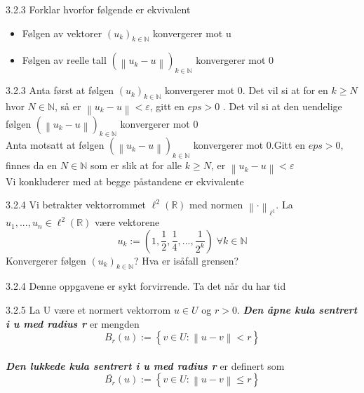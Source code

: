 \documentclass[a4paper,norsk]{article}
\renewcommand{\geq}{\geqslant}
\renewcommand{\leq}{\leqslant}
\newcommand{\eps} {\varepsilon}
\begin{document}
\begin{oppgavebox}{3.2.3}{}
Forklar hvorfor følgende er ekvivalent
\begin{itemize}
    \item Følgen av vektorer $ \left( u_k \right) _{k \in \mathbb{N}} $ konvergerer mot u
    \item Følgen av reelle tall $ \left( \left\lVert u_k - u \right\rVert  \right)_{k \in \mathbb{N}}  $ konvergerer mot 0
\end{itemize}

\begin{proofbox}{3.2.3}{}
Anta først at følgen $ \left( u_k \right) _{k \in \mathbb{N}} $ konvergerer mot 0. Det vil si at for en $ k\geq N $ hvor $ N \in \mathbb{N} $, så er $ \left\lVert u_k - u \right\rVert < \eps $, gitt en $ eps > 0 $ . Det vil si at den uendelige følgen $ \left( \left\lVert u_k - u \right\rVert \right)_{k \in \mathbb{N}}  $ konvergerer mot 0\\

Anta motsatt at følgen $ \left( \left\lVert u_k - u \right\rVert  \right)_{k \in \mathbb{N}}  $ konvergerer mot 0.Gitt en $ eps > 0 $, finnes da en $ N \in \mathbb{N} $ som er slik at for alle $ k \geq N $, er $ \left\lVert u_k - u \right\rVert < \eps $\\

Vi konkluderer med at begge påstandene er ekvivalente
\end{proofbox}
\end{oppgavebox}

\begin{oppgavebox}{3.2.4}{}
Vi betrakter vektorrommet $ \ell^2 (\mathbb{R}) $ med normen $ \left\lVert \cdot \right\rVert _{\ell^1} $. La $ u_1, ..., u_n \in \ell^2 (\mathbb{R}) $ være vektorene
\[
    u_k := \left( 1, \frac{ 1 }{ 2 }, \frac{ 1 }{ 4 }, ..., \frac{ 1 }{ 2^k } \right) \; \forall k \in \mathbb{N}
\]
Konvergerer følgen $ \left( u_k \right) _{k \in \mathbb{N}} $? Hva er isåfall grensen? 

\begin{proofbox}{3.2.4}{}
Denne oppgavene er sykt forvirrende. Ta det når du har tid
\end{proofbox}
\end{oppgavebox}


\begin{definitionbox}{3.2.5}{}
La U være et normert vektorrom $ u \in U $ og $ r > 0 $. \textbf{\textit{Den åpne kula sentrert i u med radius r}} er mengden
\[
    B_r(u) := \left\{ v \in U : \left\lVert u - v \right\rVert < r \right\} 
\]\\

\textbf{\textit{Den lukkede kula sentrert i u med radius r}} er definert som
\[
    \overline{B_r}(u) := \left\{ v \in U : \left\lVert u - v \right\rVert \leq r \right\} 
\]
\end{definitionbox}
\end{document}
